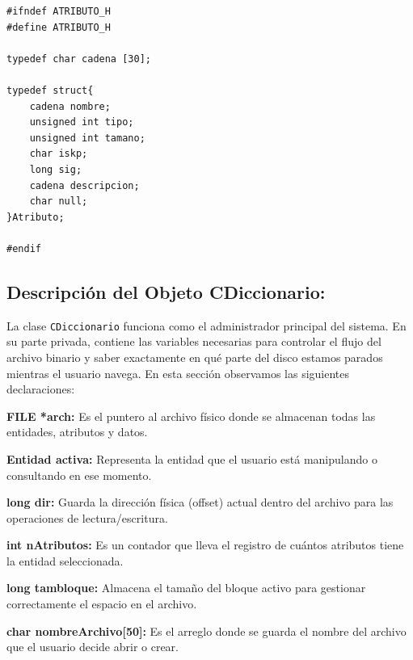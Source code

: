 \documentclass[12pt]{article}
\newcommand{\campo}[2]{
    \noindent\hangindent=1.2cm\makebox[0.6cm][l]{\color{MainBlue}\scriptsize$\bullet$} 
    \textbf{#1} #2 \par\vspace{0.1cm}
}
\begin{document}
\bigskip

\begin{lstlisting}[caption=Estructura de Datos de Atributos, label=code:atributos]
#ifndef ATRIBUTO_H
#define ATRIBUTO_H

typedef char cadena [30];

typedef struct{
    cadena nombre;
    unsigned int tipo;
    unsigned int tamano;
    char iskp;
    long sig;
    cadena descripcion;
    char null;
}Atributo;

#endif
\end{lstlisting}

\newpage

{}
\subsection*{Descripción del Objeto CDiccionario:}

La clase \texttt{CDiccionario} funciona como el administrador principal del sistema. En su parte privada, contiene las variables necesarias para controlar el flujo del archivo binario y saber exactamente en qué parte del disco estamos parados mientras el usuario navega. En esta sección observamos las siguientes declaraciones:

\campo{FILE *arch:}{Es el puntero al archivo físico donde se almacenan todas las entidades, atributos y datos.}
\campo{Entidad activa:}{Representa la entidad que el usuario está manipulando o consultando en ese momento.}
\campo{long dir:}{Guarda la dirección física (offset) actual dentro del archivo para las operaciones de lectura/escritura.}
\campo{int nAtributos:}{Es un contador que lleva el registro de cuántos atributos tiene la entidad seleccionada.}
\campo{long tambloque:}{Almacena el tamaño del bloque activo para gestionar correctamente el espacio en el archivo.}
\campo{char nombreArchivo[50]:}{Es el arreglo donde se guarda el nombre del archivo que el usuario decide abrir o crear.}
\end{document}
